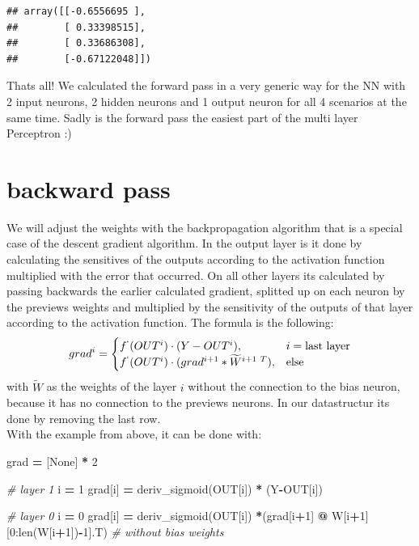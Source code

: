 \documentclass[
]{book}
\newenvironment{Shaded}{\begin{snugshade}}{\end{snugshade}}
\newcommand{\BuiltInTok}[1]{#1}
\newcommand{\CommentTok}[1]{\textcolor[rgb]{0.56,0.35,0.01}{\textit{#1}}}
\newcommand{\DecValTok}[1]{\textcolor[rgb]{0.00,0.00,0.81}{#1}}
\newcommand{\NormalTok}[1]{#1}
\newcommand{\OperatorTok}[1]{\textcolor[rgb]{0.81,0.36,0.00}{\textbf{#1}}}
\newcommand{\VariableTok}[1]{\textcolor[rgb]{0.00,0.00,0.00}{#1}}
\begin{document}
\begin{verbatim}
## array([[-0.6556695 ],
##        [ 0.33398515],
##        [ 0.33686308],
##        [-0.67122048]])
\end{verbatim}

Thats all! We calculated the forward pass in a very generic way for the NN with 2 input neurons, 2 hidden neurons and 1 output neuron for all 4 scenarios at the same time. Sadly is the forward pass the easiest part of the multi layer Perceptron :)

\hypertarget{backward-pass-1}{%
\section{backward pass}\label{backward-pass-1}}

We will adjust the weights with the backpropagation algorithm that is a special case of the descent gradient algorithm. In the output layer is it done by calculating the sensitives of the outputs according to the activation function multiplied with the error that occurred. On all other layers its calculated by passing backwards the earlier calculated gradient, splitted up on each neuron by the previews weights and multiplied by the sensitivity of the outputs of that layer according to the activation function. The formula is the following:
\[
  grad^i= 
\begin{cases}
    f^`(OUT^i) \cdot (Y-OUT^i),& i =\text{last layer}\\
    f^`(OUT^i) \cdot (grad^{i+1} * \widetilde{W}^{i+1\ T}),& \text{else}
\end{cases}
\]
with \(\widetilde{W}\) as the weights of the layer \(i\) without the connection to the bias neuron, because it has no connection to the previews neurons. In our datastructur its done by removing the last row.\\
With the example from above, it can be done with:

\begin{Shaded}
\begin{Highlighting}[]
\NormalTok{grad }\OperatorTok{=}\NormalTok{ [}\VariableTok{None}\NormalTok{] }\OperatorTok{*} \DecValTok{2}

\CommentTok{\# layer 1}
\NormalTok{i }\OperatorTok{=} \DecValTok{1}
\NormalTok{grad[i] }\OperatorTok{=}\NormalTok{ deriv\_sigmoid(OUT[i]) }\OperatorTok{*}\NormalTok{ (Y}\OperatorTok{{-}}\NormalTok{OUT[i])}

\CommentTok{\# layer 0}
\NormalTok{i }\OperatorTok{=} \DecValTok{0}
\NormalTok{grad[i] }\OperatorTok{=}\NormalTok{ deriv\_sigmoid(OUT[i]) }\OperatorTok{*}\NormalTok{(grad[i}\OperatorTok{+}\DecValTok{1}\NormalTok{] }\OperatorTok{@}\NormalTok{ W[i}\OperatorTok{+}\DecValTok{1}\NormalTok{][}\DecValTok{0}\NormalTok{:}\BuiltInTok{len}\NormalTok{(W[i}\OperatorTok{+}\DecValTok{1}\NormalTok{])}\OperatorTok{{-}}\DecValTok{1}\NormalTok{].T) }\CommentTok{\# without bias weights}
\end{Highlighting}
\end{Shaded}
\end{document}
